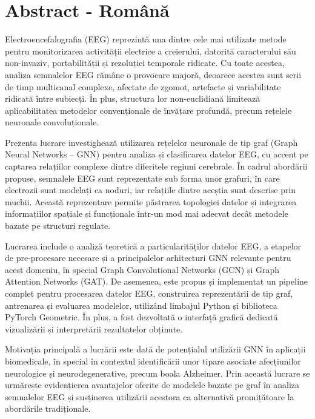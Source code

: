 \documentclass[12pt,a4paper]{report}
\theoremstyle{definition}
\theoremstyle{remark}
\begin{document}
\section*{Abstract - Română}

Electroencefalografia (EEG) reprezintă una dintre cele mai utilizate metode pentru monitorizarea activității electrice a creierului, datorită caracterului său non-invaziv, portabilității și rezoluției temporale ridicate. Cu toate acestea, analiza semnalelor EEG rămâne o provocare majoră, deoarece acestea sunt serii de timp multicanal complexe, afectate de zgomot, artefacte și variabilitate ridicată între subiecți. În plus, structura lor non-euclidiană limitează aplicabilitatea metodelor convenționale de învățare profundă, precum rețelele neuronale convoluționale.

Prezenta lucrare investighează utilizarea rețelelor neuronale de tip graf (Graph Neural Networks -- GNN) pentru analiza și clasificarea datelor EEG, cu accent pe captarea relațiilor complexe dintre diferitele regiuni cerebrale. În cadrul abordării propuse, semnalele EEG sunt reprezentate sub forma unor grafuri, în care electrozii sunt modelați ca noduri, iar relațiile dintre aceștia sunt descrise prin muchii. Această reprezentare permite păstrarea topologiei datelor și integrarea informațiilor spațiale și funcționale într-un mod mai adecvat decât metodele bazate pe structuri regulate.

Lucrarea include o analiză teoretică a particularităților datelor EEG, a etapelor de pre-procesare necesare și a principalelor arhitecturi GNN relevante pentru acest domeniu, în special Graph Convolutional Networks (GCN) și Graph Attention Networks (GAT). De asemenea, este propus și implementat un pipeline complet pentru procesarea datelor EEG, construirea reprezentării de tip graf, antrenarea și evaluarea modelelor, utilizând limbajul Python și biblioteca PyTorch Geometric. În plus, a fost dezvoltată o interfață grafică dedicată vizualizării și interpretării rezultatelor obținute.

Motivația principală a lucrării este dată de potențialul utilizării GNN în aplicații biomedicale, în special în contextul identificării unor tipare asociate afecțiunilor neurologice și neurodegenerative, precum boala Alzheimer. Prin această lucrare se urmărește evidențierea avantajelor oferite de modelele bazate pe graf în analiza semnalelor EEG și susținerea utilizării acestora ca alternativă promițătoare la abordările tradiționale.

\newpage
\normalsize{}
\end{document}
